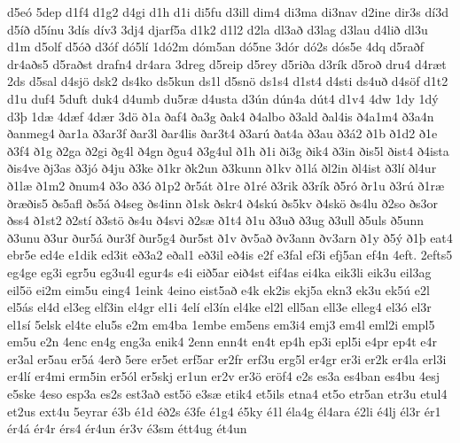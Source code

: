{d5e^^f3
5dep
d1f4
d1g2
d4gi
d1h
d1i
di5fu
d3ill
dim4
di3ma
di3nav
d2ine
dir3s
d^^ed3d
d5^^ed^^f0
d5^^ednu
3d^^eds
d^^edv3
3dj4
djarf5a
d1k2
d1l2
d2la
dl3a^^f0
d3lag
d3lau
d4li^^f0
dl3u
d1m
d5olf
d5^^f3^^f0
d3^^f3f
d^^f35l^^ed
1d^^f32m
d^^f3m5an
d^^f35ne
3d^^f3r
d^^f32s
d^^f3s5e
4dq
d5ra^^f0f
dr4a^^f0s5
d5ra^^f0st
drafn4
dr4ara
3dreg
d5reip
d5rey
d5ri^^f0a
d3r^^edk
d5ro^^f0
dru4
d4r^^e6t
2ds
d5sal
d4sj^^f6
dsk2
ds4ko
ds5kun
ds1l
d5sn^^f6
ds1s4
d1st4
d4sti
ds4u^^f0
d4s^^f6f
d1t2
d1u
duf4
5duft
duk4
d4umb
du5r^^e6
d4usta
d3^^fan
d^^fan4a
d^^fat4
d1v4
4dw
1dy
1d^^fd
d3^^fe
1d^^e6
4d^^e6f
4d^^e6r
3d^^f6
^^f01a
^^f0af4
^^f0a3g
^^f0ak4
^^f04albo
^^f03ald
^^f0al4is
^^f04a1m4
^^f03a4n
^^f0anmeg4
^^f0ar1a
^^f03ar3f
^^f0ar3l
^^f0ar4lis
^^f0ar3t4
^^f03ar^^fa
^^f0at4a
^^f03au
^^f03^^e12
^^f01b
^^f01d2
^^f01e
^^f03f4
^^f01g
^^f02ga
^^f02gi
^^f0g4l
^^f04gn
^^f0gu4
^^f03g4ul
^^f01h
^^f01i
^^f0i3g
^^f0ik4
^^f03in
^^f0is5l
^^f0ist4
^^f04ista
^^f0is4ve
^^f0j3as
^^f03j^^f3
^^f04ju
^^f03ke
^^f01kr
^^f0k2un
^^f03kunn
^^f01kv
^^f01l^^e1
^^f0l2in
^^f0l4ist
^^f03l^^ed
^^f0l4ur
^^f01l^^e6
^^f01m2
^^f0num4
^^f03o
^^f03^^f3
^^f01p2
^^f0r5^^e1t
^^f01re
^^f01r^^e9
^^f03rik
^^f03r^^edk
^^f05r^^f3
^^f0r1u
^^f03r^^fa
^^f01r^^e6
^^f0r^^e6^^f0is5
^^f0s5afl
^^f0s5^^e1
^^f04seg
^^f0s4inn
^^f01sk
^^f0skr4
^^f04sk^^fa
^^f0s5kv
^^f04sk^^f6
^^f0s4lu
^^f02so
^^f0s3or
^^f0ss4
^^f01st2
^^f02st^^ed
^^f03st^^f6
^^f0s4u
^^f04svi
^^f02s^^e6
^^f01t4
^^f01u
^^f03u^^f0
^^f03ug
^^f03ull
^^f05uls
^^f05unn
^^f03unu
^^f03ur
^^f0ur5^^e1
^^f0ur3f
^^f0ur5g4
^^f0ur5st
^^f01v
^^f0v5a^^f0
^^f0v3ann
^^f0v3arn
^^f01y
^^f05^^fd
^^f01^^fe
eat4
ebr5e
ed4e
e1dik
ed3it
e^^f03a2
e^^f0al1
e^^f03il
e^^f04is
e2f
e3fal
ef3i
efj5an
ef4n
4eft.
2efts5
eg4ge
eg3i
egr5u
eg3u4l
egur4s
e4i
ei^^f05ar
ei^^f04st
eif4as
ei4ka
eik3li
eik3u
eil3ag
eil5^^f6
ei2m
eim5u
eing4
1eink
4eino
eist5a^^f0
e4k
ek2is
ekj5a
ekn3
ek3u
ek5^^fa
e2l
el5^^e1s
el4d
el3eg
elf3in
el4gr
el1i
4el^^ed
el3^^edn
el4ke
el2l
ell5an
ell3e
elleg4
el3^^f3
el3r
el1s^^ed
5elsk
el4te
elu5s
e2m
em4ba
1embe
em5ens
em3i4
emj3
em4l
eml2i
empl5
em5u
e2n
4enc
en4g
eng3a
enik4
2enn
enn4t
en4t
ep4h
ep3i
epl5i
e4pr
ep4t
e4r
er3al
er5au
er5^^e1
4er^^f0
5ere
er5et
erf5ar
er2fr
erf3u
erg5l
er4gr
er3i
er2k
er4la
erl3i
er4l^^ed
er4mi
erm5in
er5^^f3l
er5skj
er1un
er2v
er3^^f6
er^^f6f4
e2s
es3a
es4ban
es4bu
4esj
e5ske
4eso
esp3a
es2s
est3a^^f0
est5^^f6
e3s^^e6
etik4
et5ils
etna4
et5o
etr5an
etr3u
etul4
et2us
ext4u
5eyrar
^^e93b
^^e91d
^^e9^^f02s
^^e93fe
^^e91g4
^^e95ky
^^e91l
^^e9la4g
^^e9l4ara
^^e92li
^^e94lj
^^e9l3r
^^e9r1
^^e9r4^^e1
^^e9r4r
^^e9rs4
^^e9r4un
^^e9r3v
^^e93sm
^^e9tt4ug
^^e9t4un
}
